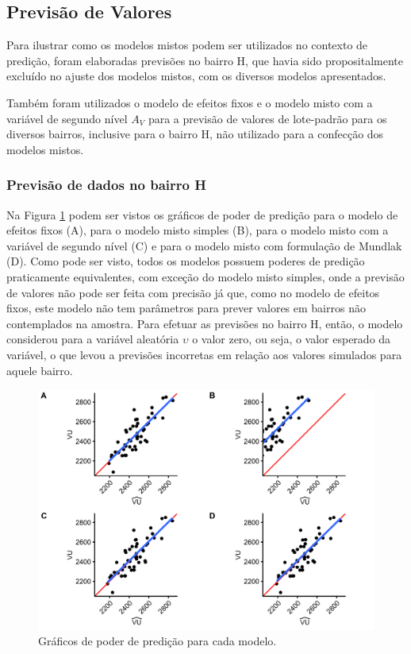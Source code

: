 \documentclass[
  a4paper, 11pt]{article}
\begin{document}
\hypertarget{previsuxe3o-de-valores}{%
\subsection{Previsão de Valores}\label{previsuxe3o-de-valores}}

Para ilustrar como os modelos mistos podem ser utilizados no contexto de
predição, foram elaboradas previsões no bairro H, que havia sido
propositalmente excluído no ajuste dos modelos mistos, com os diversos
modelos apresentados.

Também foram utilizados o modelo de efeitos fixos e o modelo misto com a
variável de segundo nível \(A_V\) para a previsão de valores de
lote-padrão para os diversos bairros, inclusive para o bairro H, não
utilizado para a confecção dos modelos mistos.

\hypertarget{previsuxe3o-de-dados-no-bairro-h}{%
\subsubsection{Previsão de dados no bairro
H}\label{previsuxe3o-de-dados-no-bairro-h}}

Na Figura \ref{fig:powerPlots} podem ser vistos os gráficos de poder de
predição para o modelo de efeitos fixos (A), para o modelo misto simples
(B), para o modelo misto com a variável de segundo nível (C) e para o
modelo misto com formulação de Mundlak (D). Como pode ser visto, todos
os modelos possuem poderes de predição praticamente equivalentes, com
exceção do modelo misto simples, onde a previsão de valores não pode ser
feita com precisão já que, como no modelo de efeitos fixos, este modelo
não tem parâmetros para prever valores em bairros não contemplados na
amostra. Para efetuar as previsões no bairro H, então, o modelo
considerou para a variável aleatória \(\upsilon\) o valor zero, ou seja,
o valor esperado da variável, o que levou a previsões incorretas em
relação aos valores simulados para aquele bairro.

\begin{figure}[H]

{\centering \includegraphics[width=1\linewidth]{images/powerPlots-1} 

}

\caption{Gráficos de poder de predição para cada modelo.}\label{fig:powerPlots}
\end{figure}
\end{document}
